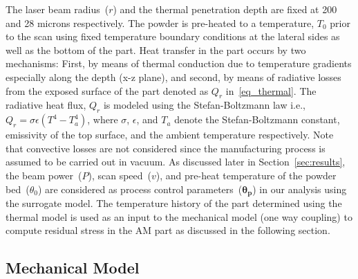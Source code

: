 The laser beam radius~($r$) and the thermal penetration depth are fixed at 200 and 28
microns respectively. The powder is pre-heated to a temperature, $T_0$ prior to the scan using fixed temperature
boundary conditions at the lateral sides as well as the bottom of the part. Heat transfer in the part occurs by two
mechanisms: First, by means of thermal conduction due to temperature gradients especially along the depth (x-z plane),
and second, by means of radiative losses from the exposed surface of the part denoted as $Q_r$ in~\eqref{eq_thermal}.
The radiative heat flux, $Q_r$ is modeled using the Stefan-Boltzmann law i.e., $Q_r=\sigma\epsilon(T^4-T_a^4)$, where
$\sigma$, $\epsilon$, and $T_a$ denote the Stefan-Boltzmann constant, emissivity of the top surface, and the ambient
temperature respectively. Note that convective losses are not considered since the manufacturing process is 
assumed to be
carried out in vacuum. As discussed later in Section~\ref{sec:results}, the beam power~($P$), scan speed~($v$), and 
pre-heat temperature of the powder bed~($\theta_0$) are considered as process control parameters~($\bm{\theta_p}$)
in our analysis using the surrogate model. The temperature history of the part determined using the thermal model
is used as an input to the mechanical model (one way coupling) to compute residual stress in the AM part as 
discussed in the following section. 

\subsection{Mechanical Model}
\label{sub:mech}

